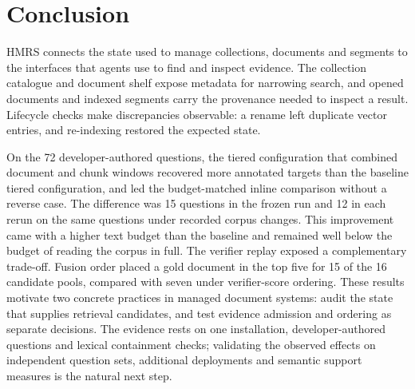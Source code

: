 \section{Conclusion}
\label{sec:conclusion}

HMRS connects the state used to manage collections, documents and segments
to the interfaces that agents use to find and inspect evidence. The
collection catalogue and document shelf expose metadata for narrowing
search, and opened documents and indexed segments carry the provenance
needed to inspect a result. Lifecycle checks make discrepancies observable:
a rename left duplicate vector entries, and re-indexing restored the expected
state.

On the 72 developer-authored questions, the tiered configuration that
combined document and chunk windows recovered more annotated targets
than the baseline tiered configuration, and led the budget-matched
inline comparison without a reverse case. The difference was 15
questions in the frozen run and 12 in each rerun on the same questions
under recorded corpus changes.
This improvement came with a higher text budget than the baseline and
remained well below the budget of reading the corpus in full. The verifier
replay exposed a complementary trade-off. Fusion order placed a gold
document in the top five for 15 of the 16 candidate pools, compared with
seven under verifier-score ordering.
These results motivate two concrete practices in managed document systems:
audit the state that supplies retrieval candidates, and test evidence
admission and ordering as separate decisions.
The evidence rests on one installation, developer-authored questions and
lexical containment checks; validating the observed effects on independent
question sets, additional deployments and semantic support measures is the
natural next step.
